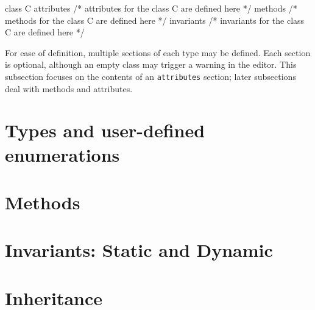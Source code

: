 \begin{code}
class C {
  attributes
    /* attributes for the class C are defined here */
  methods
    /* methods for the class C are defined here */
  invariants
    /* invariants for the class C are defined here */
}
\end{code}

For ease of definition, multiple sections of each type may be
defined.  Each section is optional, although an empty class may
trigger a warning in the editor.  This subsection focuses on the
contents of an \verb|attributes| section; later subsections deal with
methods and attributes.



\section{Types and user-defined enumerations}

\section{Methods}

\section{Invariants: Static and Dynamic}

\section{Inheritance}